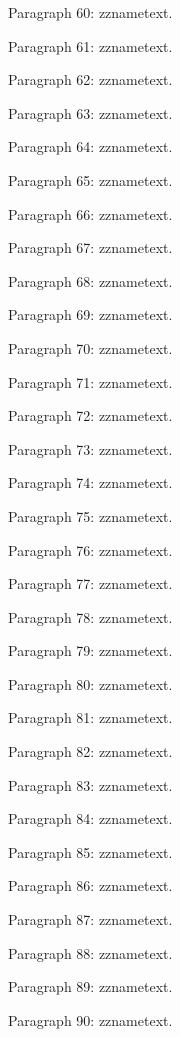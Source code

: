 \documentclass{article}
\begin{document}
Paragraph 60: \csname zzname\endcsname text.

Paragraph 61: \csname zzname\endcsname text.

Paragraph 62: \csname zzname\endcsname text.

Paragraph 63: \csname zzname\endcsname text.

Paragraph 64: \csname zzname\endcsname text.

Paragraph 65: \csname zzname\endcsname text.

Paragraph 66: \csname zzname\endcsname text.

Paragraph 67: \csname zzname\endcsname text.

Paragraph 68: \csname zzname\endcsname text.

Paragraph 69: \csname zzname\endcsname text.

Paragraph 70: \csname zzname\endcsname text.

Paragraph 71: \csname zzname\endcsname text.

Paragraph 72: \csname zzname\endcsname text.

Paragraph 73: \csname zzname\endcsname text.

Paragraph 74: \csname zzname\endcsname text.

Paragraph 75: \csname zzname\endcsname text.

Paragraph 76: \csname zzname\endcsname text.

Paragraph 77: \csname zzname\endcsname text.

Paragraph 78: \csname zzname\endcsname text.

Paragraph 79: \csname zzname\endcsname text.

Paragraph 80: \csname zzname\endcsname text.

Paragraph 81: \csname zzname\endcsname text.

Paragraph 82: \csname zzname\endcsname text.

Paragraph 83: \csname zzname\endcsname text.

Paragraph 84: \csname zzname\endcsname text.

Paragraph 85: \csname zzname\endcsname text.

Paragraph 86: \csname zzname\endcsname text.

Paragraph 87: \csname zzname\endcsname text.

Paragraph 88: \csname zzname\endcsname text.

Paragraph 89: \csname zzname\endcsname text.

Paragraph 90: \csname zzname\endcsname text.
\end{document}
